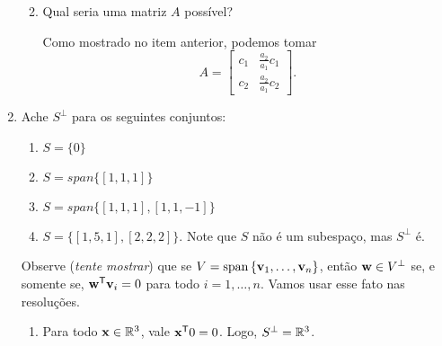 \documentclass[leqno]{article}
\begin{document}
\begin{enumerate}
\begin{enumerate}
\begin{sol}
\end{sol} 

\item Qual seria uma matriz $A$ possível?

\begin{sol} 

    Como mostrado no item anterior, podemos tomar
    \begin{equation*}
        A =
        \begin{bmatrix}
            c_{ 1 } & \frac{ a_{ 2 } }{ a_{ 1 } } c_{ 1 } \\
            c_{ 2 } & \frac{ a_{ 2 } }{ a_{ 1 } } c_{ 2 }
        \end{bmatrix}
    .\end{equation*}

\end{sol} 

\end{enumerate}



\item Ache $S^{\perp}$ para os seguintes conjuntos:

\begin{enumerate}

\item $S = \{0\}$


\item $S = span\{[1,1,1]\}$

\item $S = span\{[1,1,1], [1,1,-1]\}$

\item $S = \{[1,5,1], [2,2,2]\}$. Note que $S$ não é um subespaço, mas $S^\perp$ é.

\end{enumerate}

\begin{sol}
    Observe (\emph{tente mostrar}) que se \( V = \operatorname{span} \left\{ \mathbf{v}_{ 1 }, \dots, \mathbf{v}_{ n } \right\} \), então \( \mathbf{w} \in V^{ \perp } \) se, e somente se, \( \mathbf{w}^{ \mathsf{T} } \mathbf{v}_{ i } = 0 \) para todo \( i = 1, \dots, n \).
    Vamos usar esse fato nas resoluções.

	\begin{enumerate}    
		\item Para todo \( \mathbf{x} \in \mathbb{R}^{ 3 } \), vale \( \mathbf{x}^{ \mathsf{T} } 0 = 0 \).
            Logo, \( S^{ \perp } = \mathbb{R}^{ 3 } \).


\end{enumerate}
\end{sol}
\end{enumerate}
\end{document}
